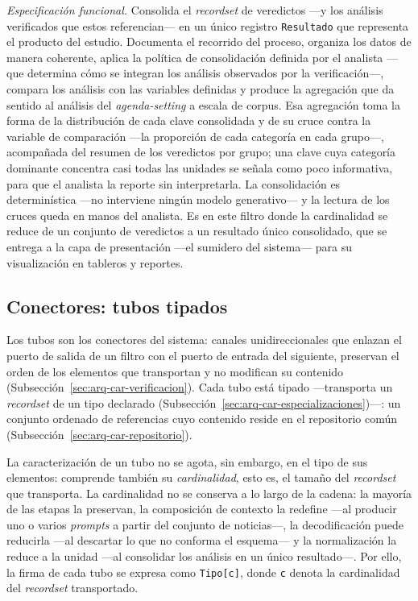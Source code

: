 \documentclass[12pt]{report}
\begin{document}
\textit{Especificación funcional.} Consolida el \textit{recordset} de veredictos ---y los análisis verificados que estos referencian--- en un único registro \texttt{Resultado} que representa el producto del estudio. Documenta el recorrido del proceso, organiza los datos de manera coherente, aplica la política de consolidación definida por el analista ---que determina cómo se integran los análisis observados por la verificación---, compara los análisis con las variables definidas y produce la agregación que da sentido al análisis del \textit{agenda-setting} a escala de corpus. Esa agregación toma la forma de la distribución de cada clave consolidada y de su cruce contra la variable de comparación ---la proporción de cada categoría en cada grupo---, acompañada del resumen de los veredictos por grupo; una clave cuya categoría dominante concentra casi todas las unidades se señala como poco informativa, para que el analista la reporte sin interpretarla. La consolidación es determinística ---no interviene ningún modelo generativo--- y la lectura de los cruces queda en manos del analista. Es en este filtro donde la cardinalidad se reduce de un conjunto de veredictos a un resultado único consolidado, que se entrega a la capa de presentación ---el sumidero del sistema--- para su visualización en tableros y reportes.

\subsection{Conectores: tubos tipados}
\label{sec:arq-car-tubos}

Los tubos son los conectores del sistema: canales unidireccionales que enlazan el puerto de salida de un filtro con el puerto de entrada del siguiente, preservan el orden de los elementos que transportan y no modifican su contenido (Subsección~\ref{sec:arq-car-verificacion}). Cada tubo está tipado ---transporta un \textit{recordset} de un tipo declarado (Subsección~\ref{sec:arq-car-especializaciones})---: un conjunto ordenado de referencias cuyo contenido reside en el repositorio común (Subsección~\ref{sec:arq-car-repositorio}).

La caracterización de un tubo no se agota, sin embargo, en el tipo de sus elementos: comprende también su \textit{cardinalidad}, esto es, el tamaño del \textit{recordset} que transporta. La cardinalidad no se conserva a lo largo de la cadena: la mayoría de las etapas la preservan, la composición de contexto la redefine ---al producir uno o varios \textit{prompts} a partir del conjunto de noticias---, la decodificación puede reducirla ---al descartar lo que no conforma el esquema--- y la normalización la reduce a la unidad ---al consolidar los análisis en un único resultado---. Por ello, la firma de cada tubo se expresa como \texttt{Tipo[c]}, donde \texttt{c} denota la cardinalidad del \textit{recordset} transportado.
\end{document}
